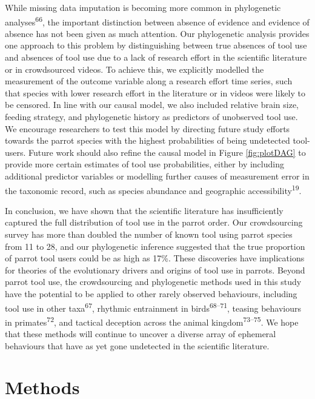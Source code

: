 \documentclass[
  man,floatsintext]{apa6}
\begin{document}
While missing data imputation is becoming more common in phylogenetic analyses\textsuperscript{66}, the important distinction between absence of evidence and evidence of absence has not been given as much attention. Our phylogenetic analysis provides one approach to this problem by distinguishing between true absences of tool use and absences of tool use due to a lack of research effort in the scientific literature or in crowdsourced videos. To achieve this, we explicitly modelled the measurement of the outcome variable along a research effort time series, such that species with lower research effort in the literature or in videos were likely to be censored. In line with our causal model, we also included relative brain size, feeding strategy, and phylogenetic history as predictors of unobserved tool use. We encourage researchers to test this model by directing future study efforts towards the parrot species with the highest probabilities of being undetected tool-users. Future work should also refine the causal model in Figure \ref{fig:plotDAG} to provide more certain estimates of tool use probabilities, either by including additional predictor variables or modelling further causes of measurement error in the taxonomic record, such as species abundance and geographic accessibility\textsuperscript{19}.

In conclusion, we have shown that the scientific literature has insufficiently captured the full distribution of tool use in the parrot order. Our crowdsourcing survey has more than doubled the number of known tool using parrot species from 11 to 28, and our phylogenetic inference suggested that the true proportion of parrot tool users could be as high as 17\%. These discoveries have implications for theories of the evolutionary drivers and origins of tool use in parrots. Beyond parrot tool use, the crowdsourcing and phylogenetic methods used in this study have the potential to be applied to other rarely observed behaviours, including tool use in other taxa\textsuperscript{67}, rhythmic entrainment in birds\textsuperscript{68--71}, teasing behaviours in primates\textsuperscript{72}, and tactical deception across the animal kingdom\textsuperscript{73--75}. We hope that these methods will continue to uncover a diverse array of ephemeral behaviours that have as yet gone undetected in the scientific literature.

\hypertarget{methods}{%
\section{Methods}\label{methods}}
\end{document}
